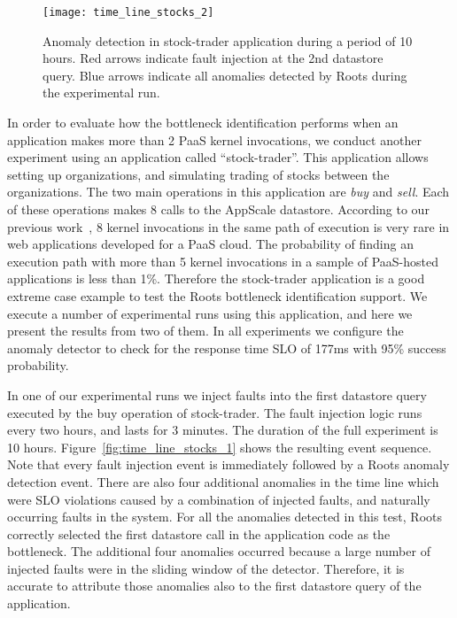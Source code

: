 \begin{figure}
\centering
\texttt{[image: time\_line\_stocks\_2]}
\caption{Anomaly detection in stock-trader application during a period of 10 hours. Red arrows indicate fault injection
at the 2nd datastore query. Blue arrows indicate all anomalies detected by Roots during the experimental run.}
\label{fig:time_line_stocks_2}
\end{figure}

In order to evaluate how the bottleneck identification performs when an application makes more than 2
PaaS kernel invocations, we conduct another experiment using an application
called ``stock-trader''.
This application allows setting up organizations, and simulating trading of stocks between the
organizations. The two main operations in this application are \textit{buy} and \textit{sell}. Each of
these operations makes 8 calls to the AppScale datastore. 
According to our previous work~\cite{Jayathilaka:2015:RTS:2806777.2806842}, 8 kernel invocations in the
same path of execution is very rare in web applications developed for a PaaS cloud. The probability
of finding an execution path with more than 5 kernel invocations in a sample of PaaS-hosted
applications is less than 1\%. Therefore the stock-trader application is a good extreme case
example to test the Roots bottleneck identification support.
We execute a number of experimental runs using this application,
and here we present the results from two of them. In all experiments we configure the anomaly
detector to check for the response time SLO of 177ms with 95\% success probability.

In one of our experimental runs we inject faults into the first datastore query executed by the buy operation
of stock-trader. The fault injection logic runs every two hours, and lasts for 3 minutes. The duration of
the full experiment is 10 hours. 
Figure~\ref{fig:time_line_stocks_1} shows the resulting event sequence. Note that every fault injection
event is immediately followed by a Roots anomaly detection event. There are also four additional
anomalies in the time line which were SLO violations caused by a combination of injected faults, and
naturally occurring faults in the system. For all the anomalies detected
in this test, Roots correctly selected the first datastore call in the application code as the bottleneck. 
The additional four anomalies occurred because a large number of injected faults were in the sliding window
of the detector. Therefore, it is accurate to attribute those anomalies also to the first datastore query
of the application.

